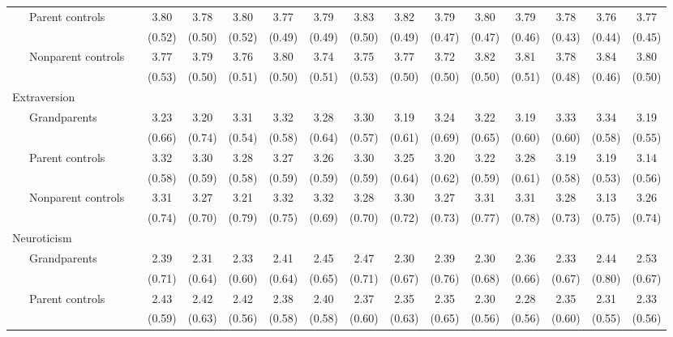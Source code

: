 \documentclass[
  english,
  man, noextraspace]{apa7}
\newenvironment{lltable}{\begin{landscape}\begin{center}\begin{ThreePartTable}}{\end{ThreePartTable}\end{center}\end{landscape}}
\begin{document}
\begin{appendix}
\begin{lltable}
{\begin{longtable}{lccccccccccccc}
\ \ \ Parent controls \textcolor{white}{C} & 3.80 & 3.78 & 3.80 & 3.77 & 3.79 & 3.83 & 3.82 & 3.79 & 3.80 & 3.79 & 3.78 & 3.76 & 3.77\\
\ \ \ \textcolor{white}{Cp} & (0.52) & (0.50) & (0.52) & (0.49) & (0.49) & (0.50) & (0.49) & (0.47) & (0.47) & (0.46) & (0.43) & (0.44) & (0.45)\\
\ \ \ Nonparent controls \textcolor{white}{C} & 3.77 & 3.79 & 3.76 & 3.80 & 3.74 & 3.75 & 3.77 & 3.72 & 3.82 & 3.81 & 3.78 & 3.84 & 3.80\\
\ \ \ \textcolor{white}{Cn} & (0.53) & (0.50) & (0.51) & (0.50) & (0.51) & (0.53) & (0.50) & (0.50) & (0.50) & (0.51) & (0.48) & (0.46) & (0.50)\\
Extraversion &  &  &  &  &  &  &  &  &  &  &  &  & \\
\ \ \ Grandparents \textcolor{white}{E} & 3.23 & 3.20 & 3.31 & 3.32 & 3.28 & 3.30 & 3.19 & 3.24 & 3.22 & 3.19 & 3.33 & 3.34 & 3.19\\
\ \ \ \textcolor{white}{Eg} & (0.66) & (0.74) & (0.54) & (0.58) & (0.64) & (0.57) & (0.61) & (0.69) & (0.65) & (0.60) & (0.60) & (0.58) & (0.55)\\
\ \ \ Parent controls \textcolor{white}{E} & 3.32 & 3.30 & 3.28 & 3.27 & 3.26 & 3.30 & 3.25 & 3.20 & 3.22 & 3.28 & 3.19 & 3.19 & 3.14\\
\ \ \ \textcolor{white}{Ep} & (0.58) & (0.59) & (0.58) & (0.59) & (0.59) & (0.59) & (0.64) & (0.62) & (0.59) & (0.61) & (0.58) & (0.53) & (0.56)\\
\ \ \ Nonparent controls \textcolor{white}{E} & 3.31 & 3.27 & 3.21 & 3.32 & 3.32 & 3.28 & 3.30 & 3.27 & 3.31 & 3.31 & 3.28 & 3.13 & 3.26\\
\ \ \ \textcolor{white}{En} & (0.74) & (0.70) & (0.79) & (0.75) & (0.69) & (0.70) & (0.72) & (0.73) & (0.77) & (0.78) & (0.73) & (0.75) & (0.74)\\
Neuroticism &  &  &  &  &  &  &  &  &  &  &  &  & \\
\ \ \ Grandparents \textcolor{white}{N} & 2.39 & 2.31 & 2.33 & 2.41 & 2.45 & 2.47 & 2.30 & 2.39 & 2.30 & 2.36 & 2.33 & 2.44 & 2.53\\
\ \ \ \textcolor{white}{Ng} & (0.71) & (0.64) & (0.60) & (0.64) & (0.65) & (0.71) & (0.67) & (0.76) & (0.68) & (0.66) & (0.67) & (0.80) & (0.67)\\
\ \ \ Parent controls \textcolor{white}{N} & 2.43 & 2.42 & 2.42 & 2.38 & 2.40 & 2.37 & 2.35 & 2.35 & 2.30 & 2.28 & 2.35 & 2.31 & 2.33\\
\ \ \ \textcolor{white}{Np} & (0.59) & (0.63) & (0.56) & (0.58) & (0.58) & (0.60) & (0.63) & (0.65) & (0.56) & (0.56) & (0.60) & (0.55) & (0.56)\\

\end{longtable}}
\end{lltable}
\end{appendix}
\end{document}
